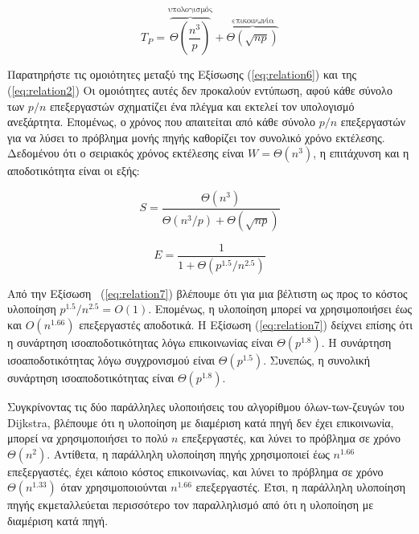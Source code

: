 \documentclass[12pt,a4paper]{article} %
\begin{document}
{\begin{equation}
T_P = \overbrace{\Theta\!\left(\frac{n^3}{p}\right)}^{\text{υπολογισμός}} 
+ \overbrace{\Theta\!\left({\sqrt{n p}}\right)}^{\text{επικοινωνία}}
\label{eq:relation6}
\end{equation}


Παρατηρήστε τις ομοιότητες μεταξύ της Εξίσωσης (\ref{eq:relation6}) και της (\ref{eq:relation2}) Οι ομοιότητες αυτές δεν προκαλούν εντύπωση, αφού κάθε σύνολο των $p/n$ επεξεργαστών σχηματίζει ένα πλέγμα και εκτελεί τον υπολογισμό ανεξάρτητα. Επομένως, ο χρόνος που απαιτείται από κάθε σύνολο $p/n$ επεξεργαστών για να λύσει το πρόβλημα μονής πηγής καθορίζει τον συνολικό χρόνο εκτέλεσης. Δεδομένου ότι ο σειριακός χρόνος εκτέλεσης είναι $W = \Theta(n^3)$, η επιτάχυνση και η αποδοτικότητα είναι οι εξής:

\[
S = \frac{\Theta(n^3)}{\Theta(n^3/p) + \Theta(\sqrt{np})}
\]

\begin{equation}
E = \frac{1}{1 + \Theta(p^{1.5}/n^{2.5})}
\label{eq:relation7}
\end{equation}


Από την Εξίσωση ~(\ref{eq:relation7}) βλέπουμε ότι για μια βέλτιστη ως προς το κόστος υλοποίηση $p^{1.5}/n^{2.5} = O(1)$. Επομένως, η υλοποίηση μπορεί να χρησιμοποιήσει έως και $O(n^{1.66})$ επεξεργαστές αποδοτικά. Η Εξίσωση (\ref{eq:relation7}) δείχνει επίσης ότι η συνάρτηση ισοαποδοτικότητας λόγω επικοινωνίας είναι $\Theta(p^{1.8})$. Η συνάρτηση ισοαποδοτικότητας λόγω συγχρονισμού είναι $\Theta(p^{1.5})$. Συνεπώς, η συνολική συνάρτηση ισοαποδοτικότητας είναι $\Theta(p^{1.8})$. 

Συγκρίνοντας τις δύο παράλληλες υλοποιήσεις του αλγορίθμου όλων-των-ζευγών του Dijkstra, βλέπουμε ότι η υλοποίηση με διαμέριση κατά πηγή δεν έχει επικοινωνία, μπορεί να χρησιμοποιήσει το πολύ $n$ επεξεργαστές, και λύνει το πρόβλημα σε χρόνο $\Theta(n^2)$. Αντίθετα, η παράλληλη υλοποίηση πηγής χρησιμοποιεί έως $n^{1.66}$ επεξεργαστές, έχει κάποιο κόστος επικοινωνίας, και λύνει το πρόβλημα σε χρόνο $\Theta(n^{1.33})$ όταν χρησιμοποιούνται $n^{1.66}$ επεξεργαστές. Έτσι, η παράλληλη υλοποίηση πηγής εκμεταλλεύεται περισσότερο τον παραλληλισμό από ότι η υλοποίηση με διαμέριση κατά πηγή.

}
\end{document}

